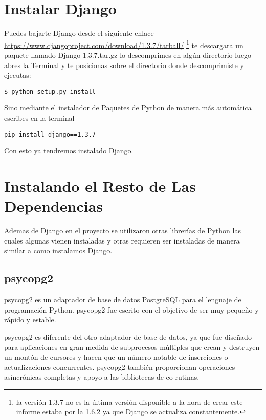 ﻿\section{Instalar Django}

Puedes bajarte Django desde el siguiente enlace \url{https://www.djangoproject.com/download/1.3.7/tarball/}
\footnote {la versión 1.3.7 no es la última versión disponible a la hora de crear este informe estaba por la 1.6.2 ya que Django se actualiza constantemente.} te descargara un paquete llamado Django-1.3.7.tar.gz lo descomprimes en algún directorio luego abres la Terminal y te posicionas sobre el directorio donde descomprimiste y ejecutas:

\begin{lstlisting}[style=consola]
    $ python setup.py install 
\end{lstlisting}
\vspace{0.1cm}

Sino mediante el instalador de Paquetes de Python de manera más automática escribes en la terminal

\begin{lstlisting}[style=consola]
     pip install django==1.3.7
\end{lstlisting}
\vspace{0.1cm}

Con esto ya tendremos instalado Django.

\section{Instalando el Resto de Las Dependencias}

Ademas de Django en el proyecto se utilizaron otras librerías de Python las cuales algunas vienen instaladas y otras requieren ser instaladas de manera similar a como instalamos Django.

\subsection{psycopg2}

psycopg2 es un adaptador de base de datos PostgreSQL para el lenguaje de programación Python. psycopg2 fue escrito con el objetivo de ser muy pequeño y rápido y estable. 

psycopg2 es diferente del otro adaptador de base de datos, ya que fue diseñado para aplicaciones en gran medida de subprocesos múltiples que crean y destruyen un montón de cursores y hacen que un número notable de inserciones o actualizaciones concurrentes. psycopg2 también proporcionan operaciones asincrónicas completas y apoyo a las bibliotecas de co-rutinas. 

